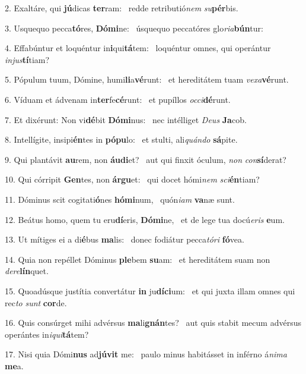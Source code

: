 2. Exaltáre, qui \textbf{jú}dicas \textbf{ter}ram: \ast\  redde retributió\textit{nem} \textit{su}\textbf{pér}bis.\

3. Usquequo pecca\textbf{tó}res, \textbf{Dó}\textbf{mi}ne: \ast\  úsquequo peccatóres glo\textit{ri}\textit{a}\textbf{bún}tur:\

4. Effabúntur et loquéntur in\textbf{i}qui\textbf{tá}tem: \ast\  loquéntur omnes, qui operántur \textit{in}\textit{jus}\textbf{tí}tiam?\

5. Pópulum tuum, Dómine, humi\textbf{li}a\textbf{vé}runt: \ast\  et hereditátem tuam \textit{ve}\textit{xa}\textbf{vé}runt.\

6. Víduam et ádvenam in\textbf{ter}fe\textbf{cé}runt: \ast\  et pupíllos \textit{oc}\textit{ci}\textbf{dé}runt.\

7. Et dixérunt: Non vi\textbf{dé}bit \textbf{Dó}\textbf{mi}nus: \ast\  nec intélliget \textit{De}\textit{us} \textbf{Ja}cob.\

8. Intellígite, insipi\textbf{én}tes in \textbf{pó}\textbf{pu}lo: \ast\  et stulti, ali\textit{quán}\textit{do} \textbf{sá}pite.\

9. Qui plantávit \textbf{au}rem, non \textbf{áu}\textbf{di}et? \ast\  aut qui finxit óculum, \textit{non} \textit{con}\textbf{sí}derat?\

10. Qui córripit \textbf{Gen}tes, non \textbf{ár}\textbf{gu}et: \ast\  qui docet hómi\textit{nem} \textit{sci}\textbf{én}tiam?\

11. Dóminus scit cogitati\textbf{ó}nes \textbf{hó}\textbf{mi}num, \ast\  quón\textit{i}\textit{am} \textbf{va}næ sunt.\

12. Beátus homo, quem tu eru\textbf{dí}eris, \textbf{Dó}\textbf{mi}ne, \ast\  et de lege tua docú\textit{e}\textit{ris} \textbf{e}um.\

13. Ut mítiges ei a di\textbf{é}bus \textbf{ma}lis: \ast\  donec fodiátur pecca\textit{tó}\textit{ri} \textbf{fó}vea.\

14. Quia non repéllet Dóminus \textbf{ple}bem \textbf{su}am: \ast\  et hereditátem suam non \textit{de}\textit{re}\textbf{lín}quet.\

15. Quoadúsque justítia convertátur \textbf{in} ju\textbf{dí}\textbf{ci}um: \ast\  et qui juxta illam omnes qui rec\textit{to} \textit{sunt} \textbf{cor}de.\

16. Quis consúrget mihi advérsus \textbf{ma}li\textbf{gnán}tes? \ast\  aut quis stabit mecum advérsus operántes in\textit{i}\textit{qui}\textbf{tá}tem?\

17. Nisi quia Dómi\textbf{nus} ad\textbf{jú}\textbf{vit} me: \ast\  paulo minus habitásset in inférno á\textit{ni}\textit{ma} \textbf{me}a.\

